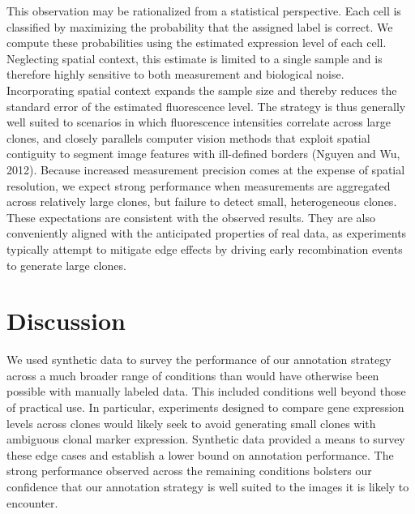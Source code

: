 This observation may be rationalized from a statistical perspective. Each cell is classified by maximizing the probability that the assigned label is correct. We compute these probabilities using the estimated expression level of each cell. Neglecting spatial context, this estimate is limited to a single sample and is therefore highly sensitive to both measurement and biological noise. Incorporating spatial context expands the sample size and thereby reduces the standard error of the estimated fluorescence level. The strategy is thus generally well suited to scenarios in which fluorescence intensities correlate across large clones, and closely parallels computer vision methods that exploit spatial contiguity to segment image features with ill-defined borders (Nguyen and Wu, 2012). Because increased measurement precision comes at the expense of spatial resolution, we expect strong performance when measurements are aggregated across relatively large clones, but failure to detect small, heterogeneous clones. These expectations are consistent with the observed results. They are also conveniently aligned with the anticipated properties of real data, as experiments typically attempt to mitigate edge effects by driving early recombination events to generate large clones.

\section{Discussion}

We used synthetic data to survey the performance of our annotation strategy across a much broader range of conditions than would have otherwise been possible with manually labeled data. This included conditions well beyond those of practical use. In particular, experiments designed to compare gene expression levels across clones would likely seek to avoid generating small clones with ambiguous clonal marker expression. Synthetic data provided a means to survey these edge cases and establish a lower bound on annotation performance. The strong performance observed across the remaining conditions bolsters our confidence that our annotation strategy is well suited to the images it is likely to encounter.


